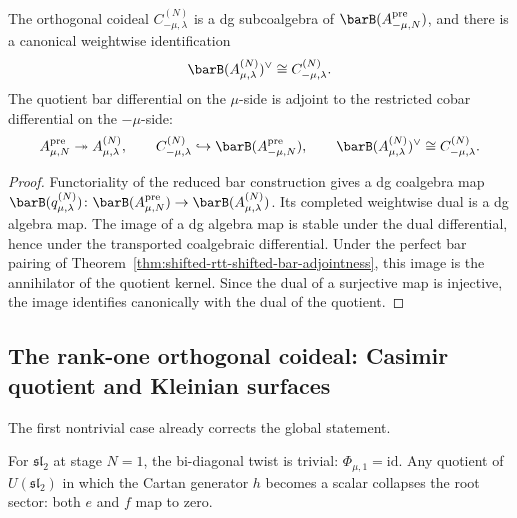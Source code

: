 \begin{theorem}
\label{thm:shifted-rtt-coideal-descent}
The orthogonal coideal $C_{-\mu,\lambda}^{(N)}$ is a dg
subcoalgebra of $\barB(A_{-\mu,N}^{\mathrm{pre}})$, and there is a
canonical weightwise identification
\[
\barB(A_{\mu,\lambda}^{(N)})^\vee
\cong C_{-\mu,\lambda}^{(N)}.
\]
The quotient bar differential on the $\mu$-side is adjoint to the
restricted cobar differential on the $-\mu$-side:
\[
A_{\mu,N}^{\mathrm{pre}} \twoheadrightarrow
A_{\mu,\lambda}^{(N)},
\qquad
C_{-\mu,\lambda}^{(N)} \hookrightarrow
\barB(A_{-\mu,N}^{\mathrm{pre}}),
\qquad
\barB(A_{\mu,\lambda}^{(N)})^\vee
\cong C_{-\mu,\lambda}^{(N)}.
\]
\end{theorem}

\begin{proof}
Functoriality of the reduced bar construction gives a dg coalgebra
map
$\barB(q_{\mu,\lambda}^{(N)}) \colon
\barB(A_{\mu,N}^{\mathrm{pre}}) \to
\barB(A_{\mu,\lambda}^{(N)})$.
Its completed weightwise dual is a dg algebra map. The image of a dg
algebra map is stable under the dual differential, hence under the
transported coalgebraic differential. Under the perfect bar pairing
of Theorem~\ref{thm:shifted-rtt-shifted-bar-adjointness}, this image
is the annihilator of the quotient kernel. Since the dual of a
surjective map is injective, the image identifies canonically with
the dual of the quotient.
\end{proof}


\subsection{The rank-one orthogonal coideal: Casimir quotient and
Kleinian surfaces}
\label{subsec:rank-one-orthogonal-coideal}

The first nontrivial case already corrects the global statement.

\begin{proposition}
\label{prop:stage-one-cartan-collapse}
For $\mathfrak{sl}_2$ at stage $N = 1$, the bi-diagonal twist is
trivial: $\Phi_{\mu,1} = \mathrm{id}$. Any quotient of
$U(\mathfrak{sl}_2)$ in which the Cartan generator $h$ becomes a
scalar collapses the root sector: both $e$ and $f$ map to zero.
\end{proposition}

